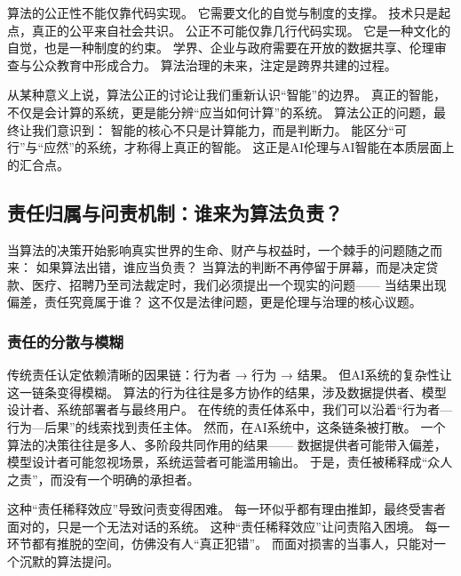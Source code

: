 算法的公正性不能仅靠代码实现。  
它需要文化的自觉与制度的支撑。  
技术只是起点，真正的公平来自社会共识。  
公正不可能仅靠几行代码实现。  
它是一种文化的自觉，也是一种制度的约束。  
学界、企业与政府需要在开放的数据共享、伦理审查与公众教育中形成合力。  
算法治理的未来，注定是跨界共建的过程。

从某种意义上说，算法公正的讨论让我们重新认识“智能”的边界。  
真正的智能，不仅是会计算的系统，更是能分辨“应当如何计算”的系统。  
算法公正的问题，最终让我们意识到：  
智能的核心不只是计算能力，而是判断力。  
能区分“可行”与“应然”的系统，才称得上真正的智能。  
这正是AI伦理与AI智能在本质层面上的汇合点。

\subsection{责任归属与问责机制：谁来为算法负责？}

当算法的决策开始影响真实世界的生命、财产与权益时，一个棘手的问题随之而来：  
如果算法出错，谁应当负责？  
当算法的判断不再停留于屏幕，而是决定贷款、医疗、招聘乃至司法裁定时，我们必须提出一个现实的问题——  
当结果出现偏差，责任究竟属于谁？  
这不仅是法律问题，更是伦理与治理的核心议题。

\subsubsection{责任的分散与模糊}

传统责任认定依赖清晰的因果链：行为者 → 行为 → 结果。  
但AI系统的复杂性让这一链条变得模糊。  
算法的行为往往是多方协作的结果，涉及数据提供者、模型设计者、系统部署者与最终用户。  
在传统的责任体系中，我们可以沿着“行为者—行为—后果”的线索找到责任主体。  
然而，在AI系统中，这条链条被打散。  
一个算法的决策往往是多人、多阶段共同作用的结果——  
数据提供者可能带入偏差，模型设计者可能忽视场景，系统运营者可能滥用输出。  
于是，责任被稀释成“众人之责”，而没有一个明确的承担者。

这种“责任稀释效应”导致问责变得困难。  
每一环似乎都有理由推卸，最终受害者面对的，只是一个无法对话的系统。  
这种“责任稀释效应”让问责陷入困境。  
每一环节都有推脱的空间，仿佛没有人“真正犯错”。  
而面对损害的当事人，只能对一个沉默的算法提问。

